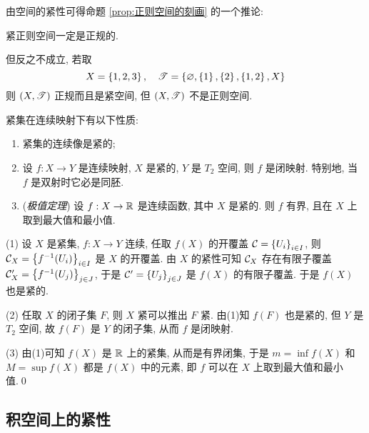     由空间的紧性可得命题 \ref{prop:正则空间的刻画} 的一个推论:

    \begin{Corollary}
        紧正则空间一定是正规的.
    \end{Corollary}

    但反之不成立, 若取
    \[
        X=\left\{ 1,2,3 \right\},\quad \mathscr{T}=\left\{ \varnothing,\left\{ 1 \right\},\left\{ 2 \right\},\left\{ 1,2 \right\},X \right\}
    \]
    则 $ (X,\mathscr{T}) $ 正规而且是紧空间, 但 $ (X,\mathscr{T}) $ 不是正则空间.

    \begin{Proposition}
        紧集在连续映射下有以下性质:
        \begin{enumerate}
            \item 紧集的连续像是紧的;
            \item 设 $ f : X\to Y $ 是连续映射, $ X $ 是紧的, $ Y $ 是 $ T_2 $ 空间, 则 $ f $ 是闭映射. 特别地, 当 $ f $ 是双射时它必是同胚.
            \item (\emph{极值定理}) 设 $ f : X\to\mathbb{R} $ 是连续函数, 其中 $ X $ 是紧的. 则 $ f $ 有界, 且在 $ X $ 上取到最大值和最小值.
        \end{enumerate}
    \end{Proposition}
    \begin{Proof}
        (1) 设 $ X $ 是紧集, $ f : X\to Y $ 连续, 任取 $ f(X) $ 的开覆盖 $ \mathcal{C}=\left\{ U_i \right\}_{i\in I} $, 则 $ \mathcal{C}_X=\left\{ f^{-1}(U_i) \right\}_{i\in I} $ 是 $ X $ 的开覆盖. 由 $ X $ 的紧性可知 $ \mathcal{C}_X $ 存在有限子覆盖 $ \mathcal{C}'_X=\left\{ f^{-1}(U_j) \right\}_{j\in J} $, 于是 $ \mathcal{C}'=\left\{ U_j \right\}_{j\in J} $ 是 $ f(X) $ 的有限子覆盖. 于是 $ f(X) $ 也是紧的.

        (2) 任取 $ X $ 的闭子集 $ F $, 则 $ X $ 紧可以推出 $ F $ 紧. 由(1)知 $ f(F) $ 也是紧的, 但 $ Y $ 是 $ T_2 $ 空间, 故 $ f(F) $ 是 $ Y $ 的闭子集, 从而 $ f $ 是闭映射.

        (3) 由(1)可知 $ f(X) $ 是 $ \mathbb{R} $ 上的紧集, 从而是有界闭集, 于是 $ m=\inf f(X) $ 和 $ M=\sup f(X) $ 都是 $ f(X) $ 中的元素, 即 $ f $ 可以在 $ X $ 上取到最大值和最小值.\qed
    \end{Proof}

\subsection{积空间上的紧性}

